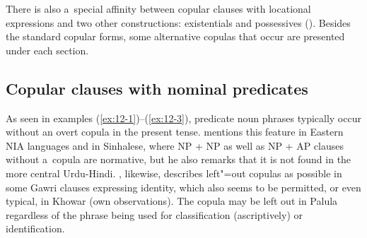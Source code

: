 

There is also a~special affinity between copular clauses with locational expressions and two other constructions: existentials and possessives (). Besides the standard copular forms, some alternative copulas that occur are presented under each section.


\subsection{Copular clauses with nominal predicates}
\label{subsec:12-1-1}


As seen in examples (\ref{ex:12-1})--(\ref{ex:12-3}), predicate noun phrases typically occur without an overt copula in the present tense. \citet[337]{masica1991} mentions this feature in Eastern NIA languages and in Sinhalese, where NP + NP as well as NP + AP clauses without a~copula are normative, but he also remarks that it is not found in the more central Urdu-Hindi. \citet[118--122]{baart1999a}, likewise, describes left"=out copulas as possible in some Gawri clauses expressing identity, which also seems to be permitted, or even typical, in Khowar (own observations). The copula may be left out in Palula regardless of the phrase being used for classification (ascriptively) or identification. 

